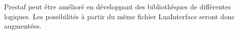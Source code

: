 \documentclass{article}%
\begin{document}
Prestaf peut être amélioré en développant des bibliothèques de différentes logiques. Les possibilités à partir du même fichier LuaInterface seront donc augmentées.

\appendix

\printglossaries

{}


\end{document}
